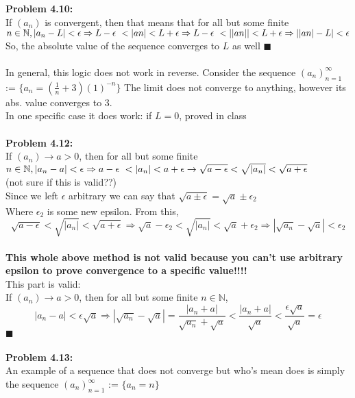 \documentclass[11pt]{article}
\begin{document}
    \textbf{Problem 4.10:}\\
    If $(a_n)$ is convergent, then that means that for all but some finite $n \in \mathbb{N}, \\
    |a_n - L| < \epsilon \Rightarrow L - \epsilon\ < |an| < L + \epsilon \Rightarrow L - \epsilon\ < ||an|| < L + \epsilon \Rightarrow
    ||an| - L| < \epsilon$\\ So, the absolute value of the sequence converges to $L$ as well $\blacksquare$\\\\
    In general, this logic does not work in reverse. Consider the sequence
    $(a_n)^\infty_{n=1}$ := $\{a_n = (\frac{1}{n} +3)(1)^{-n} \}$ The limit does not converge to anything, however its abs. value converges to 3.
    \\ In one specific case it does work: if $L = 0$, proved in class
    \\\\
    \textbf{Problem 4.12:}\\
    If $(a_n) \rightarrow a > 0$, then for all but some finite $n \in \mathbb{N}, \\
    |a_n - a| < \epsilon \Rightarrow a - \epsilon\ < |a_n| < a + \epsilon \rightarrow \sqrt{a - \epsilon} < \sqrt{|a_n|} < \sqrt{a + \epsilon}$
    \\ (not sure if this is valid??)\\
    Since we left $\epsilon$ arbitrary we can say that $\sqrt{a \pm \epsilon} = \sqrt{a} \pm \epsilon_2$\\
    Where $\epsilon_2$ is some new epsilon. From this,
    \[\sqrt{a - \epsilon} < \sqrt{|a_n|} < \sqrt{a + \epsilon} \Rightarrow \sqrt{a} - \epsilon_2 < \sqrt{|a_n|} < \sqrt{a} + \epsilon_2 \Rightarrow |\sqrt{a_n} - \sqrt{a}| < \epsilon_2\]\\
    \textbf{This whole above method is not valid because you can't use arbitrary epsilon to prove convergence to a specific value!!!!}
    \\
    This part is valid:\\
    If $(a_n) \rightarrow a > 0$, then for all but some finite $n \in \mathbb{N}$,
    \[|a_n - a| < \epsilon\sqrt{a} \Rightarrow |\sqrt{a_n} - \sqrt{a}| = \frac{|a_n + a|}{\sqrt{a_n} + \sqrt{a}}
    < \frac{|a_n + a|}{\sqrt{a}} < \frac{\epsilon\sqrt{a}}{\sqrt{a}} = \epsilon\]
    $\blacksquare$\\
    \\
    \textbf{Problem 4.13:}\\
    An example of a sequence that does not converge but who's mean does is simply the sequence
    $(a_n)^\infty_{n=1}$ := $\{a_n = n\}$
\end{document}
